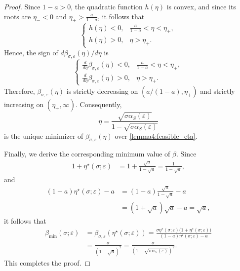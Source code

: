 \documentclass[letterpaper,10pt,conference]{ieeeconf}
\begin{document}
\begin{proof}
  Since $1-a>0$, the quadratic function $h(\eta)$ is convex, and since its roots are $\eta_-<0$ and $\eta_+>\frac{a}{1-a}$, it follows that
  \begin{equation}
    \begin{cases}
      h(\eta) < 0, & \frac{a}{1-a} < \eta < \eta_+, \\
      h(\eta) > 0, & \eta > \eta_+.
    \end{cases}
  \end{equation}
  Hence, the sign of  $d\beta_{\sigma,\varepsilon}(\eta)/d\eta$ is
  \begin{equation}
    \begin{cases}
      \frac{d}{d\eta}\beta_{\sigma,\varepsilon}(\eta) < 0, & \frac{a}{1-a} < \eta < \eta_+, \\
      \frac{d}{d\eta}\beta_{\sigma,\varepsilon}(\eta) > 0, & \eta > \eta_+.
    \end{cases}
  \end{equation}
  Therefore, $\beta_{\sigma,\varepsilon}(\eta)$ is strictly decreasing on $(a/(1-a),\eta_+)$ and strictly increasing on $(\eta_+,\infty)$.
  Consequently,
  \begin{equation}
    \eta = \frac{\sqrt{\sigma\alpha_S(\varepsilon)}}{1-\sqrt{\sigma\alpha_S(\varepsilon)}}
  \end{equation}
  is the unique minimizer of $\beta_{\sigma,\varepsilon}(\eta)$ over \eqref{lemma4:feasible_eta}.

  Finally, we derive the corresponding minimum value of $\beta$.
  Since
  \begin{align}
    1+\eta^\star(\sigma;\varepsilon)
    &= 1 + \frac{\sqrt{a}}{1-\sqrt{a}}
    = \frac{1}{1-\sqrt{a}},
  \end{align}
  and
  \begin{align}
    (1-a)\eta^\star(\sigma;\varepsilon) - a
    &= (1-a)\frac{\sqrt{a}}{1-\sqrt{a}} - a \\
    &= (1+\sqrt{a})\sqrt{a} - a
    = \sqrt{a},
  \end{align}
  it follows that
  \begin{align}
    \beta_{\min}(\sigma;\varepsilon)
    &= \beta_{\sigma,\varepsilon}\left(\eta^\star(\sigma;\varepsilon)\right)
    = \frac{\sigma \eta^\star(\sigma;\varepsilon)\bigl(1+\eta^\star(\sigma;\varepsilon)\bigr)}{(1-a)\eta^\star(\sigma;\varepsilon)-a} \\
    &= \frac{\sigma}{(1-\sqrt{a})^2}
    = \frac{\sigma} {\left(1-\sqrt{\sigma\alpha_S(\varepsilon)}\right)^2}.
  \end{align}
  This completes the proof.
\end{proof}
\end{document}
